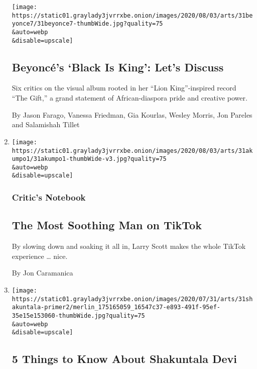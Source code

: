 \begin{enumerate}
  \texttt{[image: https://static01.graylady3jvrrxbe.onion/images/2020/08/03/arts/31beyonce7/31beyonce7-thumbWide.jpg?quality=75\\\&auto=webp\\\&disable=upscale]}

  \hypertarget{beyoncuxe9s-black-is-king-lets-discuss}{%
  \subsection{Beyoncé's `Black Is King': Let's
  Discuss}\label{beyoncuxe9s-black-is-king-lets-discuss}}

  Six critics on the visual album rooted in her ``Lion King''-inspired
  record ``The Gift,'' a grand statement of African-diaspora pride and
  creative power.

  By Jason Farago, Vanessa Friedman, Gia Kourlas, Wesley Morris, Jon
  Pareles and Salamishah Tillet
\item
  \href{/2020/07/31/arts/larry-scott-tiktok-larryakumpo.html}{}

  \texttt{[image: https://static01.graylady3jvrrxbe.onion/images/2020/08/03/arts/31akumpo1/31akumpo1-thumbWide-v3.jpg?quality=75\\\&auto=webp\\\&disable=upscale]}

  \hypertarget{critics-notebook-2}{%
  \subsubsection{Critic's Notebook}\label{critics-notebook-2}}

  \hypertarget{the-most-soothing-man-on-tiktok}{%
  \subsection{The Most Soothing Man on
  TikTok}\label{the-most-soothing-man-on-tiktok}}

  By slowing down and soaking it all in, Larry Scott makes the whole
  TikTok experience \ldots{} nice.

  By Jon Caramanica
\item
  \href{/2020/07/31/movies/shakuntala-devi-movie.html}{}

  \texttt{[image: https://static01.graylady3jvrrxbe.onion/images/2020/07/31/arts/31shakuntala-primer2/merlin\_175165059\_16547c37-e893-491f-95ef-35e15e153060-thumbWide.jpg?quality=75\\\&auto=webp\\\&disable=upscale]}

  \hypertarget{5-things-to-know-about-shakuntala-devi}{%
  \subsection{5 Things to Know About Shakuntala
  Devi}\label{5-things-to-know-about-shakuntala-devi}}


\end{enumerate}
